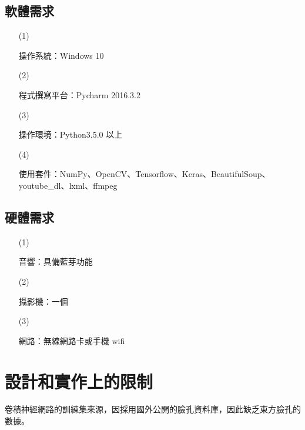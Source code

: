\documentclass[12pt]{scrreprt}
\begin{document}
\subsection{軟體需求}
\begin{itemize}
\item[(1)]{\begin{bfseries}{操作系統：}Windows 10\end{bfseries}}
\item[(2)]{\begin{bfseries}{程式撰寫平台：}Pycharm 2016.3.2\end{bfseries}}
\item[(3)]{\begin{bfseries}{操作環境：}Python3.5.0 以上\end{bfseries}}
\item[(4)]{\begin{bfseries}{使用套件：}NumPy、OpenCV、Tensorflow、Keras、BeautifulSoup、\\
youtube_dl、lxml、ffmpeg\end{bfseries}}%
\end{itemize}

\subsection{硬體需求}
\begin{itemize}
\item[(1)]{\begin{bfseries}{音響：}具備藍芽功能\end{bfseries}}
\item[(2)]{\begin{bfseries}{攝影機：}一個\end{bfseries}}
\item[(3)]{\begin{bfseries}{網路：}無線網路卡或手機 wifi\end{bfseries}}

\end{itemize}

\section{設計和實作上的限制}
卷積神經網路的訓練集來源，因採用國外公開的臉孔資料庫，因此缺乏東方臉孔的數據。
\end{document}

